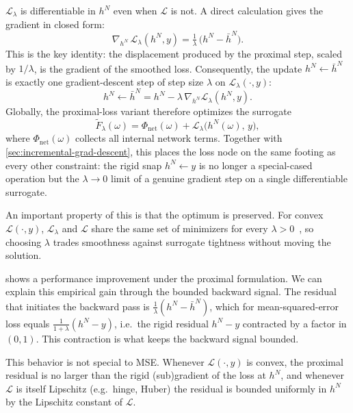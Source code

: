 $\mathcal{L}_{\lambda}$ is differentiable in $h^{N}$ even when $\mathcal{L}$ is
not. A direct calculation gives the gradient in closed form:
\begin{equation}
\nabla_{\!h^{N}}\,\mathcal{L}_{\lambda}(h^{N},y)
=
\tfrac{1}{\lambda}\,\bigl(h^{N}-\bar h^{N}\bigr).
\label{eq:moreau-grad}
\end{equation}
This is the key identity: the displacement produced by the proximal step,
scaled by $1/\lambda$, is the gradient of the smoothed loss.
Consequently, the update $h^{N}\leftarrow\bar h^{N}$ is exactly one
gradient-descent step of step size $\lambda$ on $\mathcal{L}_{\lambda}(\cdot,y)$:
\[
h^{N}\leftarrow\bar h^{N}
=h^{N}-\lambda\,\nabla_{\!h^{N}}\mathcal{L}_{\lambda}(h^{N},y).
\]
Globally, the proximal-loss variant therefore optimizes the surrogate
\begin{equation}
\widetilde{F}_{\lambda}(\omega)
=
\Phi_{\mathrm{net}}(\omega)+\mathcal{L}_{\lambda}\!\bigl(h^{N}(\omega),\,y\bigr),
\end{equation}
where $\Phi_{\mathrm{net}}(\omega)$ collects all internal network terms. Together with \cref{sec:incremental-grad-descent}, this places the loss node on
the same footing as every other constraint: the rigid snap $h^N\leftarrow y$ is no
longer a special-cased operation but the $\lambda\to 0$ limit of a genuine
gradient step on a single differentiable surrogate.

An important property of this is that the optimum is preserved. For convex
$\mathcal{L}(\cdot,y)$, $\mathcal{L}_{\lambda}$ and $\mathcal{L}$ share the same
set of minimizers for every $\lambda>0$~\cite{rockafellar1998variational}, so
choosing $\lambda$ trades smoothness against surrogate tightness without moving
the solution.

 shows a performance improvement under the proximal
formulation. We can explain this empirical gain through the bounded backward
signal. The residual that initiates the backward pass is
$\tfrac{1}{\lambda}(h^{N}-\bar h^{N})$, which for mean-squared-error loss equals
$\tfrac{1}{1+\lambda}(h^{N}-y)$, i.e.\ the rigid residual $h^{N}-y$ contracted
by a factor in $(0,1)$. This contraction is what keeps the backward signal
bounded.

This behavior is not special to MSE. Whenever $\mathcal{L}(\cdot,y)$ is convex, the proximal residual is no larger than the rigid (sub)gradient of the loss at $h^{N}$, and whenever $\mathcal{L}$ is itself Lipschitz (e.g.\ hinge, Huber) the
residual is bounded uniformly in $h^{N}$ by the Lipschitz constant of
$\mathcal{L}$.

